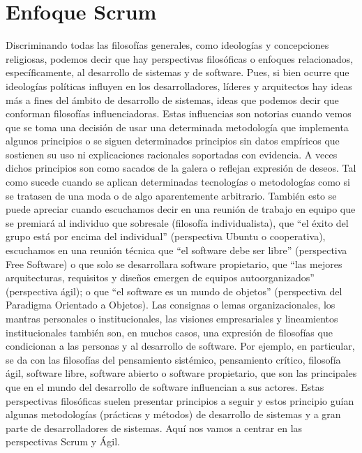 \chapter{Enfoque Scrum}

Discriminando todas las filosofías generales, como ideologías y concepciones religiosas, podemos decir que hay perspectivas filosóficas o enfoques relacionados, específicamente, al desarrollo de sistemas y de software. Pues, si bien ocurre que ideologías políticas influyen en los desarrolladores, líderes y arquitectos hay ideas más a fines del ámbito de desarrollo de sistemas, ideas que podemos decir que conforman filosofías influenciadoras. Estas influencias son notorias cuando vemos que se toma una decisión de usar una determinada metodología que implementa algunos principios o se siguen determinados principios sin datos empíricos que sostienen su uso ni explicaciones racionales soportadas con evidencia. A veces dichos principios son como sacados de la galera o reflejan expresión de deseos. Tal como sucede cuando se aplican determinadas tecnologías o metodologías como si se tratasen de una moda o de algo aparentemente arbitrario. También esto se puede apreciar cuando escuchamos decir en una reunión de trabajo en equipo que se premiará al individuo que sobresale (filosofía individualista), que “el éxito del grupo está por encima del individual” (perspectiva Ubuntu o cooperativa), escuchamos en una reunión técnica que “el software debe ser libre” (perspectiva Free Software) o que solo se desarrollara software propietario, que “las mejores arquitecturas, requisitos y diseños emergen de equipos autoorganizados” \cite{Beck-2001} (perspectiva ágil); o que “el software es un mundo de objetos” (perspectiva del Paradigma Orientado a Objetos). Las consignas o lemas organizacionales, los mantras personales o institucionales, las visiones empresariales y lineamientos institucionales también son, en muchos casos, una expresión de filosofías que condicionan a las personas y al desarrollo de software. Por ejemplo, en particular, se da con las filosofías del pensamiento sistémico, pensamiento crítico, filosofía ágil, software libre, software abierto o software propietario, que son las principales que en el mundo del desarrollo de software influencian a sus actores. Estas perspectivas filosóficas suelen presentar principios a seguir y estos principio guían algunas metodologías (prácticas y métodos) de desarrollo de sistemas y a gran parte de desarrolladores de sistemas. Aquí nos vamos a centrar en las perspectivas Scrum y Ágil.

